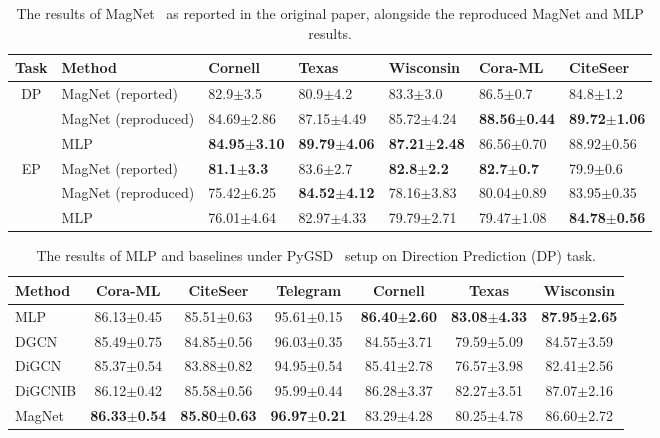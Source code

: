 \begin{table}[h]
\centering
\caption{The results of MagNet~\cite{magnet} as reported in the original paper, alongside the reproduced MagNet and
MLP results.}
\begin{tabular}{@{}cllllll@{}}
\toprule
\multicolumn{1}{l}{Task}              & Method & Cornell & Texas & Wisconsin & Cora-ML & CiteSeer \\ \midrule
\multirow{3}{*}{DP} & MagNet (reported) &82.9$\pm$3.5 &80.9$\pm$4.2 &83.3$\pm$3.0 &86.5$\pm$0.7 &84.8$\pm$1.2 \\ %
                                      & MagNet (reproduced) &84.69$\pm$2.86 &87.15$\pm$4.49 &85.72$\pm$4.24 &\textbf{88.56$\pm$0.44}
                                      &\textbf{89.72$\pm$1.06}         \\
                                      & MLP    &\textbf{84.95$\pm$3.10} &\textbf{89.79$\pm$4.06} &\textbf{87.21$\pm$2.48}
                                      &86.56$\pm$0.70        &88.92$\pm$0.56          \\ \midrule
\multirow{3}{*}{EP} & MagNet (reported) &\textbf{81.1$\pm$3.3} &83.6$\pm$2.7 &\textbf{82.8$\pm$2.2} &\textbf{82.7$\pm$0.7} &79.9$\pm$0.6   \\
                                      & MagNet (reproduced)    
&75.42$\pm$6.25 &\textbf{84.52$\pm$4.12} &78.16$\pm$3.83 &80.04$\pm$0.89 &83.95$\pm$0.35\\
                                      & MLP       &76.01$\pm$4.64&82.97$\pm$4.33 &79.79$\pm$2.71 &79.47$\pm$1.08        &\textbf{84.78$\pm$0.56}          \\ \bottomrule
\end{tabular}
\label{tb_magnet}
\end{table}

\begin{table}[h]
\centering
\caption{The results of MLP and baselines under PyGSD~\cite{dpyg} setup on Direction Prediction (DP) task.}
\begin{tabular}{lcccccc}
\toprule
Method & Cora-ML & CiteSeer & Telegram & Cornell & Texas & Wisconsin \\ \midrule
MLP       &86.13$\pm$0.45  & 85.51$\pm$0.63  & 95.61$\pm$0.15  & \textbf{86.40$\pm$2.60}  &\textbf{83.08$\pm$4.33}  & \textbf{87.95$\pm$2.65}  \\ \midrule
DGCN      & 85.49$\pm$0.75  & 84.85$\pm$0.56  & 96.03$\pm$0.35  & 84.55$\pm$3.71  & 79.59$\pm$5.09  & 84.57$\pm$3.59  \\ 
DiGCN     & 85.37$\pm$0.54  & 83.88$\pm$0.82  & 94.95$\pm$0.54  & 85.41$\pm$2.78  & 76.57$\pm$3.98  & 82.41$\pm$2.56  \\ 
DiGCNIB   & 86.12$\pm$0.42  & 85.58$\pm$0.56  & 95.99$\pm$0.44  & 86.28$\pm$3.37  &82.27$\pm$3.51  &87.07$\pm$2.16  \\ 
MagNet    & \textbf{86.33$\pm$0.54}  & \textbf{85.80$\pm$0.63}  & \textbf{96.97$\pm$0.21}  & 83.29$\pm$4.28  & 80.25$\pm$4.78  & 86.60$\pm$2.72  \\ \bottomrule
\end{tabular}%
\label{tb_dpyg_dp}
\end{table}

